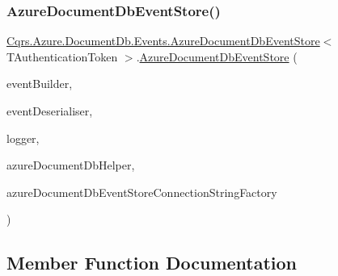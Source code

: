 \subsubsection{\texorpdfstring{Azure\+Document\+Db\+Event\+Store()}{AzureDocumentDbEventStore()}}
{\footnotesize\ttfamily \hyperlink{classCqrs_1_1Azure_1_1DocumentDb_1_1Events_1_1AzureDocumentDbEventStore}{Cqrs.\+Azure.\+Document\+Db.\+Events.\+Azure\+Document\+Db\+Event\+Store}$<$ T\+Authentication\+Token $>$.\hyperlink{classCqrs_1_1Azure_1_1DocumentDb_1_1Events_1_1AzureDocumentDbEventStore}{Azure\+Document\+Db\+Event\+Store} (\begin{DoxyParamCaption}\item[{\hyperlink{interfaceCqrs_1_1Events_1_1IEventBuilder}{I\+Event\+Builder}$<$ T\+Authentication\+Token $>$}]{event\+Builder,  }\item[{\hyperlink{interfaceCqrs_1_1Events_1_1IEventDeserialiser}{I\+Event\+Deserialiser}$<$ T\+Authentication\+Token $>$}]{event\+Deserialiser,  }\item[{I\+Logger}]{logger,  }\item[{\hyperlink{interfaceCqrs_1_1Azure_1_1DocumentDb_1_1IAzureDocumentDbHelper}{I\+Azure\+Document\+Db\+Helper}}]{azure\+Document\+Db\+Helper,  }\item[{\hyperlink{interfaceCqrs_1_1Azure_1_1DocumentDb_1_1Events_1_1IAzureDocumentDbEventStoreConnectionStringFactory}{I\+Azure\+Document\+Db\+Event\+Store\+Connection\+String\+Factory}}]{azure\+Document\+Db\+Event\+Store\+Connection\+String\+Factory }\end{DoxyParamCaption})}



\subsection{Member Function Documentation}
\mbox{\label{classCqrs_1_1Azure_1_1DocumentDb_1_1Events_1_1AzureDocumentDbEventStore_a54f298fdde141166e23f01e4911bf188}} 
